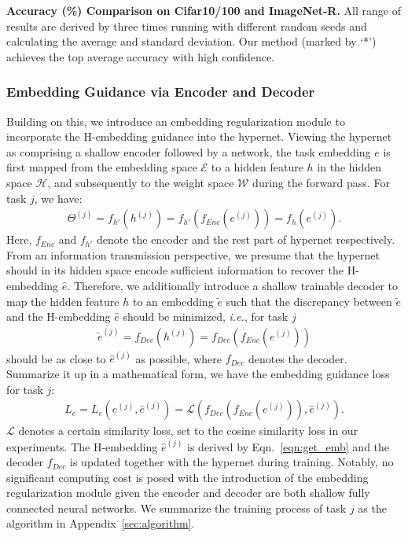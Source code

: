 \begin{table*}[!t]
    \caption{\textbf{Accuracy (\%) Comparison on Cifar10/100 and ImageNet-R.} All range of results are derived by three times running with different random seeds and calculating the average and standard deviation. Our method (marked by `*') achieves the top average accuracy with high confidence.}
    
    \label{tab:cifar}
\end{table*}

\subsubsection{Embedding Guidance via Encoder and Decoder}
\label{sec:emb_reg}
Building on this, we introduce an embedding regularization module to incorporate the H-embedding guidance into the hypernet. Viewing the hypernet as comprising a shallow encoder followed by a network, the task embedding $e$ is first mapped from the embedding space $\mathcal{E}$ to a hidden feature $h$ in the hidden space $\mathcal{H}$, and subsequently to the weight space $\mathcal{W}$ during the forward pass. 
For task $j$, we have:
\begin{align}
    \Theta^{(j)} = f_{h'}(h^{(j)}) = f_{h'}\left(f_{Enc}(e^{(j)})\right) = f_h(e^{(j)}).
\end{align}
Here, $f_{Enc}$ and $f_{h'}$ denote the encoder and the rest part of hypernet respectively. From an information transmission perspective, we presume that the hypernet should in its hidden space encode sufficient information to recover the H-embedding $\hat{e}$. Therefore, we additionally introduce a shallow trainable decoder to map the hidden feature $h$ to an embedding $\tilde{e}$ such that the discrepancy between $\tilde{e}$ and the H-embedding $\hat{e}$ should be minimized, \textit{i.e.}, for task $j$
\begin{align}
    \tilde{e}^{(j)} = f_{Dec}(h^{(j)}) = f_{Dec}\left(f_{Enc}(e^{(j)})\right)
\end{align}
should be as close to $\hat{e}^{(j)}$ as possible, where $f_{Dec}$ denotes the decoder. Summarize it up in a mathematical form, we have the embedding guidance loss for task $j$:
\begin{align}
    L_e = L_e(e^{(j)},\hat{e}^{(j)}) = \mathcal{L}\left(f_{Dec}(f_{Enc}(e^{(j)})), \hat{e}^{(j)}\right).
\end{align}
$\mathcal{L}$ denotes a certain similarity loss, set to the cosine similarity loss in our experiments. The H-embedding $\hat{e}^{(j)}$ is derived by Eqn.~\ref{eqn:get_emb} and the decoder $f_{Dec}$ is updated together with the hypernet during training. Notably, no significant computing cost is posed with the introduction of the embedding regularization module given the encoder and decoder are both shallow fully connected neural networks. We summarize the training process of task $j$ as the algorithm in Appendix~\ref{sec:algorithm}.


